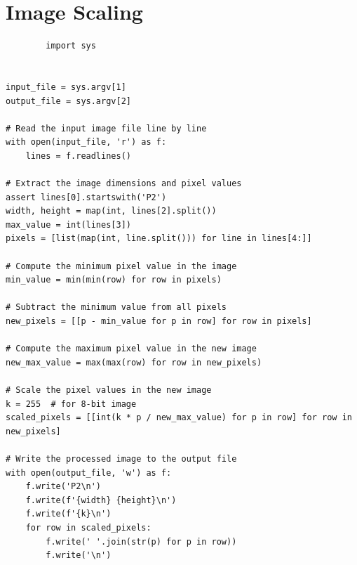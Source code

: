 \documentclass[a4paper,8pt]{article}
\begin{document}
        \section{Image Scaling}
        \begin{verbatim}
        import sys


input_file = sys.argv[1]
output_file = sys.argv[2]

# Read the input image file line by line
with open(input_file, 'r') as f:
    lines = f.readlines()

# Extract the image dimensions and pixel values
assert lines[0].startswith('P2')
width, height = map(int, lines[2].split())
max_value = int(lines[3])
pixels = [list(map(int, line.split())) for line in lines[4:]]

# Compute the minimum pixel value in the image
min_value = min(min(row) for row in pixels)

# Subtract the minimum value from all pixels
new_pixels = [[p - min_value for p in row] for row in pixels]

# Compute the maximum pixel value in the new image
new_max_value = max(max(row) for row in new_pixels)

# Scale the pixel values in the new image
k = 255  # for 8-bit image
scaled_pixels = [[int(k * p / new_max_value) for p in row] for row in new_pixels]

# Write the processed image to the output file
with open(output_file, 'w') as f:
    f.write('P2\n')
    f.write(f'{width} {height}\n')
    f.write(f'{k}\n')
    for row in scaled_pixels:
        f.write(' '.join(str(p) for p in row))
        f.write('\n')


        \end{verbatim}
        
\end{document}
